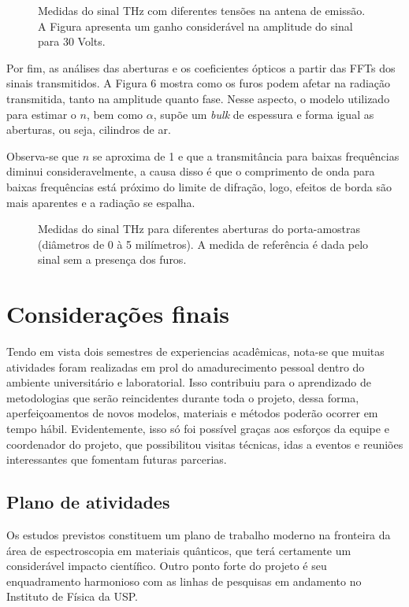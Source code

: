 \documentclass[a4paper,12pt,oneside]{article}
\begin{document}
\begin{figure}[ht]
  \centering
  \caption{Medidas do sinal THz com diferentes tensões na antena de emissão. A Figura apresenta um ganho considerável na amplitude do sinal para 30 Volts.}
  \label{fig:5}
\end{figure}

Por fim, as análises das aberturas e os coeficientes ópticos a partir das FFTs dos sinais transmitidos. A Figura 6 mostra como os furos podem afetar na radiação transmitida, tanto na amplitude quanto fase. Nesse aspecto, o modelo utilizado para estimar o $n$, bem como $\alpha$, supõe um \textit{bulk} de espessura e forma igual as aberturas, ou seja, cilindros de ar. 

Observa-se que $n$ se aproxima de 1 e que a transmitância para baixas frequências diminui consideravelmente, a causa disso é que o comprimento de onda para baixas frequências está próximo do limite de difração, logo, efeitos de borda são mais aparentes e a radiação se espalha.

\begin{figure}[ht]
  \centering
  \caption{Medidas do sinal THz para diferentes aberturas do porta-amostras (diâmetros de 0 à 5 milímetros). A medida de referência é dada pelo sinal sem a presença dos furos.}
  \label{fig:6}
\end{figure}

\section{Considerações finais}
\qquad Tendo em vista dois semestres de experiencias acadêmicas, nota-se que muitas atividades foram realizadas em prol do amadurecimento pessoal dentro do ambiente universitário e laboratorial. Isso contribuiu para o aprendizado de metodologias que serão reincidentes durante toda o projeto, dessa forma, aperfeiçoamentos de novos modelos, materiais e métodos poderão ocorrer em tempo hábil. Evidentemente, isso só foi possível graças aos esforços da equipe e coordenador do projeto, que possibilitou visitas técnicas, idas a eventos e reuniões interessantes que fomentam futuras parcerias.

\subsection{Plano de atividades}
\qquad Os estudos previstos constituem um plano de trabalho moderno na fronteira da área de espectroscopia em materiais quânticos, que terá certamente um considerável impacto científico. Outro ponto forte do projeto é seu enquadramento harmonioso com as linhas de pesquisas em andamento no Instituto de Física da USP. 
\end{document}
